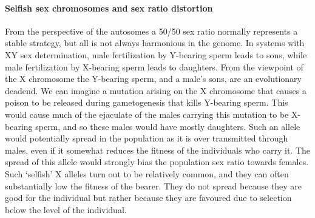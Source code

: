 {\paragraph{Selfish sex chromosomes and sex ratio distortion}
From the perspective of the autosomes a 50/50 sex ratio normally represents
a stable strategy, but all is not always harmonious in the genome. In
systems with XY sex determination, male fertilization by Y-bearing sperm
leads to sons, while male fertilization by X-bearing sperm leads to daughters. 
From the viewpoint of the X chromosome the Y-bearing sperm, and a
male's sons, are an evolutionary deadend. We can imagine a mutation
arising on the X chromosome that causes a poison to be released
during gametogenesis that kills Y-bearing sperm. This would cause much
of the ejaculate of the males carrying this mutation to be X-bearing sperm, and so these males would have mostly
daughters. Such an allele would potentially spread in the population
as it is over transmitted through males, even if it somewhat reduces
the fitness of the individuals who carry it. The spread of this allele would strongly
bias the population sex ratio towards females. Such `selfish' X
alleles turn out to be relatively common, and they can often
substantially low the fitness of the bearer. They do not spread because they are good for the individual but rather because
they are favoured due to selection below the level of the individual.

}
